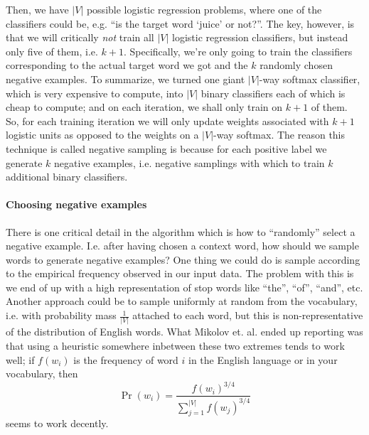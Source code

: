 \documentclass[12pt]{article}
\begin{document}
Then, we have $|V|$ possible logistic regression problems, where one of the classifiers could be, e.g. ``is the target word `juice' or not?''.  The key, however, is that we will critically \emph{not} train all $|V|$ logistic regression classifiers, but instead only five of them, i.e. $k+1$. Specifically, we're only going to train the classifiers corresponding to the actual target word we got and the $k$ randomly chosen negative examples. To summarize, we turned one giant $|V|$-way softmax classifier, which is very expensive to compute, into $|V|$ binary classifiers each of which is cheap to compute; and on each iteration, we shall only train on $k+1$ of them. So, for each training iteration we will only update weights associated with $k+1$ logistic units as opposed to the weights on a $|V|$-way softmax. The reason this technique is called negative sampling is because for each positive label we generate $k$ negative examples, i.e. negative samplings with which to train $k$ additional binary classifiers.

\paragraph{Choosing negative examples} There is one critical detail in the algorithm which is how to ``randomly'' select a negative example. I.e. after having chosen a context word, how should we sample words to generate negative examples? One thing we could do is sample according to the empirical frequency observed in our input data. The problem with this is we end of up with a high representation of stop words like ``the'', ``of'', ``and'', etc. Another approach could be to sample uniformly at random from the vocabulary, i.e. with probability mass $\frac{1}{|V|}$ attached to each word, but this is non-representative of the distribution of English words. What Mikolov et. al. ended up reporting was that using a heuristic somewhere inbetween these two extremes tends to work well; if $f(w_i)$ is the frequency of word $i$ in the English language or in your vocabulary, then
\[
  \Pr(w_i) = \frac{f(w_i)^{3/4}}{\sum_{j=1}^{|V|}f(w_j)^{3/4}}
\]
seems to work decently.
\end{document}
